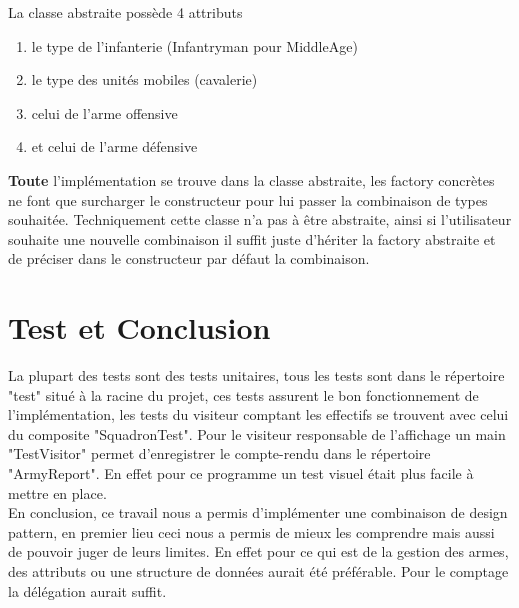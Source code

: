 \documentclass[12pt]{article}
\begin{document}
La classe abstraite possède 4 attributs 
\begin{enumerate}
\item le type de l'infanterie (Infantryman pour MiddleAge)
\item le type des unités mobiles (cavalerie)
\item celui de l'arme offensive
\item et celui de l'arme défensive
\end{enumerate}

\textbf{Toute} l'implémentation se trouve dans la classe abstraite,
les factory concrètes ne font que surcharger le constructeur pour lui passer
la combinaison de types souhaitée. Techniquement cette classe n'a pas à être abstraite,
ainsi si l'utilisateur souhaite une nouvelle combinaison il suffit juste d'hériter
la factory abstraite et de préciser dans le constructeur par défaut la combinaison.

\newpage

\section{Test et Conclusion}
La plupart des tests sont des tests unitaires, tous les tests sont dans le répertoire
"test" situé à la racine du projet, ces tests assurent le bon fonctionnement de
l'implémentation, les tests du visiteur comptant les effectifs se trouvent avec
celui du composite "SquadronTest". Pour le visiteur responsable de l'affichage
un main "TestVisitor" permet d'enregistrer le compte-rendu dans le répertoire
"ArmyReport". En effet pour ce programme un test visuel était plus facile à mettre en 
place. \\
En conclusion, ce travail nous a permis d'implémenter une combinaison de design pattern,
en premier lieu ceci nous a permis de mieux les comprendre mais aussi de pouvoir juger
de leurs limites. En effet pour ce qui est de la gestion des armes, des attributs ou une 
structure de données aurait été préférable. Pour le comptage la délégation aurait suffit.
\end{document}

